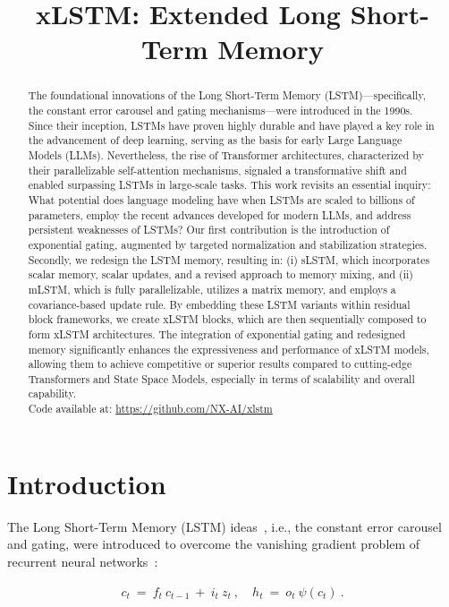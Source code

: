 \title{xLSTM: Extended Long Short-Term Memory}

\begin{abstract}
The foundational innovations of the Long Short-Term Memory (LSTM)—specifically, the constant error carousel and gating mechanisms—were introduced in the 1990s. Since their inception, LSTMs have proven highly durable and have played a key role in the advancement of deep learning, serving as the basis for early Large Language Models (LLMs). Nevertheless, the rise of Transformer architectures, characterized by their parallelizable self-attention mechanisms, signaled a transformative shift and enabled surpassing LSTMs in large-scale tasks. This work revisits an essential inquiry: What potential does language modeling have when LSTMs are scaled to billions of parameters, employ the recent advances developed for modern LLMs, and address persistent weaknesses of LSTMs? Our first contribution is the introduction of exponential gating, augmented by targeted normalization and stabilization strategies. Secondly, we redesign the LSTM memory, resulting in: (i) sLSTM, which incorporates scalar memory, scalar updates, and a revised approach to memory mixing, and (ii) mLSTM, which is fully parallelizable, utilizes a matrix memory, and employs a covariance-based update rule. By embedding these LSTM variants within residual block frameworks, we create xLSTM blocks, which are then sequentially composed to form xLSTM architectures. The integration of exponential gating and redesigned memory significantly enhances the expressiveness and performance of xLSTM models, allowing them to achieve competitive or superior results compared to cutting-edge Transformers and State Space Models, especially in terms of scalability and overall capability.\\
Code available at: \url{https://github.com/NX-AI/xlstm}
\end{abstract}

\section{Introduction}
\label{sec:intro}

The Long Short-Term Memory (LSTM) ideas~\citep{Hochreiter:91,Hochreiter:97nips,Hochreiter:97}, i.e., the constant error carousel and gating, were introduced to overcome the vanishing gradient problem of recurrent neural networks~\citep{Hochreiter:91,Hochreiter:00book}:

\begin{align}
\label{eq:lstm_idea}
  c_t \ = \ f_t \ c_{t-1} \ + \ 
          i_t \  z_t \ , \quad  
          h_t \ = \ o_t \ \psi({c_t}) \ . 
\end{align}

